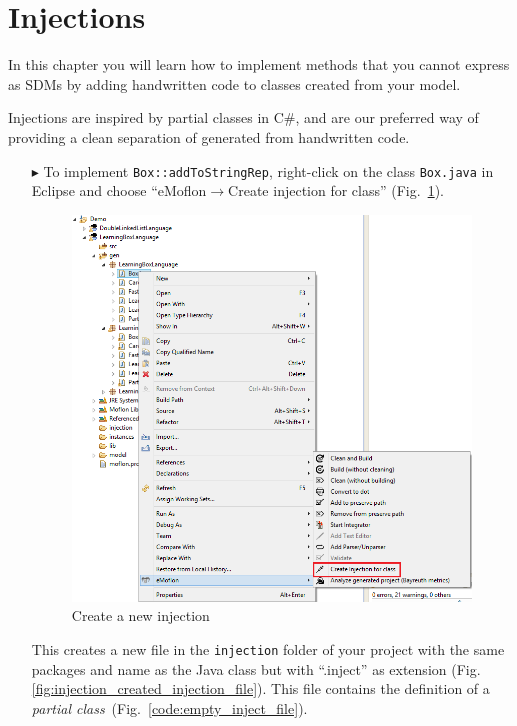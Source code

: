 \section{Injections}
\label{sec:intro_injections}

In this chapter you will learn how to implement methods that you cannot express as SDMs by adding handwritten code to classes created from your model.

Injections are inspired by partial classes in C\#, and are our preferred way of providing a clean separation of generated from handwritten code.

\begin{enumerate}
    \item[$\blacktriangleright$] To implement \texttt{Box::addToStringRep}, right-click on the class \texttt{Box.java} in Eclipse and choose ``eMoflon$\rightarrow$Create injection for class'' (Fig.~\ref{fig:injection_create_injection}).

    \begin{figure}[htbp]
        \centering
        \includegraphics[width=\textwidth]{pics/injectionBilder/create_injection_context_menu.png}
        \caption{Create a new injection}
        \label{fig:injection_create_injection}
    \end{figure}

    This creates a new file in the \texttt{injection} folder of your project with the same packages and name as the Java class but with ``.inject'' as extension (Fig. \ref{fig:injection_created_injection_file}). This file contains the definition of a \textit{partial class}~(Fig.~\ref{code:empty_inject_file}). 


\end{enumerate}
